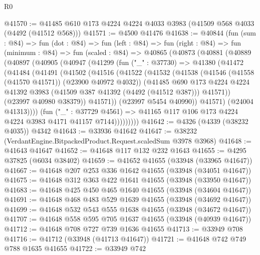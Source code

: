 \begin{lexlean}{R0}
\begin{coremodule}
@41570 := @41485 @610 @173 @4224 @4224 @4033 @3983 (@41509 @568 @4033 (@4492 (@41512 @568)))
@41571 := @4500 @41476
@41638 := @40844
    (fun (sum : @84) =>
    fun (dot : @84) =>
    fun (left : @84) =>
    fun (right : @84) =>
    fun (minimum : @84) =>
    fun (scaled : @84) =>
    @40865
      (@40873
        (@40881
          (@40889
            (@40897
              (@40905
                (@40947
                  (@41299
                    (fun ("_" : @37730) =>
                    @41380
                      (@41472
                        (@41484
                          (@41491
                            (@41502
                              (@41516
                                (@41522
                                  (@41532
                                    (@41538
                                      (@41546 (@41558 (@41570 @41571)) (@23900 @40972 @4032))
                                      (@41485
                                        @690
                                        @173
                                        @4224
                                        @4224
                                        @41392
                                        @3983
                                        (@41509 @387 @41392 (@4492 (@41512 @387)))
                                        @41571))
                                    (@23997 @40980 @38379))
                                  @41571))
                              (@23997 @5454 @40990))
                            @41571)
                          (@24004 @41313))))
                    (fun ("_" : @37729 @4561) =>
                    @41165 @117 @106 @173 @4224 @4224 @3983 @4171 @41157 @7144)))))))))
@41642 := @4326 (@4339 (@38232 @4035)) @4342
@41643 := @33936 @41642
@41647 := @38232 (VerdantEngine.BitpackedProduct.Request.scaledSum @3978 @3968)
@41648 := @41643 @41647
@41652 := @41648 @117 @132 @232 @1643
@41655 := @4295 @37825 (@6034 @38402)
@41659 := @41652 @41655 (@33948 (@33965 @41647))
@41667 := @41648 @207 @253 @336 @1642 @41655 (@33948 (@34051 @41647))
@41675 := @41648 @312 @363 @422 @1641 @41655 (@33948 (@33950 @41647))
@41683 := @41648 @425 @450 @465 @1640 @41655 (@33948 (@34604 @41647))
@41691 := @41648 @468 @483 @529 @1639 @41655 (@33948 (@34692 @41647))
@41699 := @41648 @532 @543 @555 @1638 @41655 (@33948 (@34672 @41647))
@41707 := @41648 @558 @595 @705 @1637 @41655 (@33948 (@40939 @41647))
@41712 := @41648 @708 @727 @739 @1636 @41655
@41713 := @33949 @708
@41716 := @41712 (@33948 (@41713 @41647))
@41721 := @41648 @742 @749 @788 @1635 @41655
@41722 := @33949 @742

\end{coremodule}
\end{lexlean}
